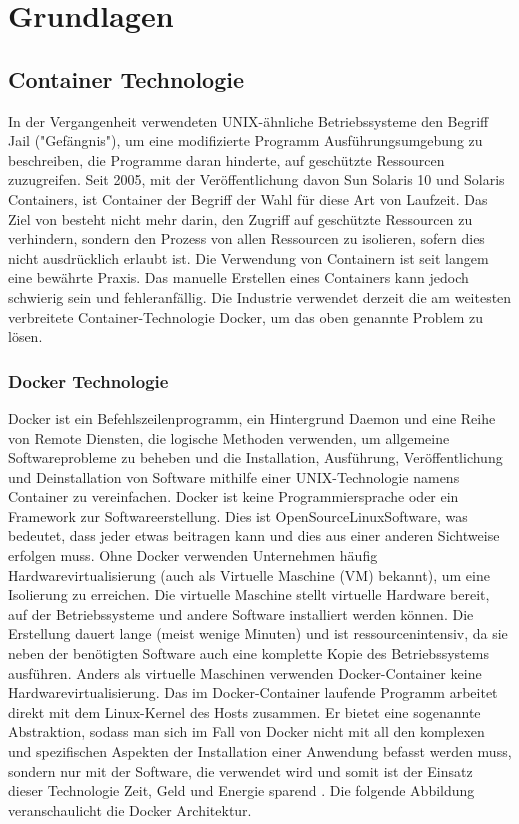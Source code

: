 \chapter{Grundlagen}

\section{Container Technologie}

In der Vergangenheit verwendeten UNIX-ähnliche Betriebssysteme den Begriff Jail
("Gefängnis"), um eine modifizierte Programm Ausführungsumgebung zu beschreiben,
die Programme daran hinderte, auf geschützte Ressourcen zuzugreifen. Seit
2005, mit der Veröffentlichung davon Sun Solaris 10 und Solaris Containers, ist Container
der Begriff der Wahl für diese Art von Laufzeit. Das Ziel von besteht nicht
mehr darin, den Zugriff auf geschützte Ressourcen zu verhindern, sondern den Prozess
von allen Ressourcen zu isolieren, sofern dies nicht ausdrücklich erlaubt ist. Die
Verwendung von Containern ist seit langem eine bewährte Praxis. Das manuelle Erstellen
eines Containers kann jedoch schwierig sein und fehleranfällig. Die Industrie
verwendet derzeit die am weitesten verbreitete Container-Technologie Docker, um
das oben genannte Problem zu lösen.

\subsection{Docker Technologie}

Docker ist ein Befehlszeilenprogramm, ein Hintergrund Daemon und eine Reihe von
Remote Diensten, die logische Methoden verwenden, um allgemeine Softwareprobleme zu beheben und die Installation, Ausführung, Veröffentlichung und Deinstallation von Software mithilfe einer UNIX-Technologie namens Container zu vereinfachen.
Docker ist keine Programmiersprache oder ein Framework zur Softwareerstellung.
Dies ist OpenSourceLinuxSoftware, was bedeutet, dass jeder etwas beitragen kann
und dies aus einer anderen Sichtweise erfolgen muss. Ohne Docker verwenden
Unternehmen häufig Hardwarevirtualisierung (auch als Virtuelle Maschine (VM)
bekannt), um eine Isolierung zu erreichen. Die virtuelle Maschine stellt virtuelle
Hardware bereit, auf der Betriebssysteme und andere Software installiert werden
können. Die Erstellung dauert lange (meist wenige Minuten) und ist ressourcenintensiv, da sie neben der benötigten Software auch eine komplette Kopie des Betriebssystems ausführen. Anders als virtuelle Maschinen verwenden Docker-Container keine Hardwarevirtualisierung. Das im Docker-Container laufende Programm arbeitet direkt mit dem Linux-Kernel des Hosts zusammen. Er bietet eine sogenannte Abstraktion, sodass man sich im Fall von Docker nicht mit all den komplexen und spezifischen Aspekten der Installation einer Anwendung befasst werden muss, sondern nur mit der Software, die verwendet wird und somit ist der Einsatz dieser Technologie Zeit, Geld und Energie sparend \cite{Docker:overview}. 
Die folgende Abbildung veranschaulicht die Docker Architektur.

